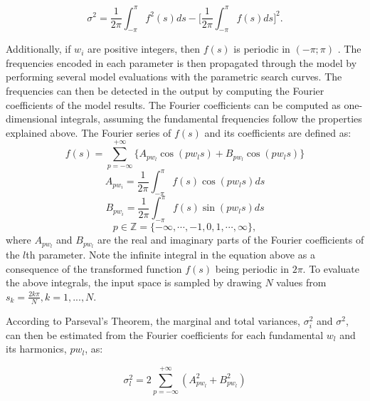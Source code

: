 \documentclass[12pt]{article}
\begin{document}
{\begin{equation}
\sigma^{2} = \frac{1}{2\pi}\int^{\pi}_{-\pi}f^{2}(s)ds - \Bigg[\frac{1}{2\pi}\int^{\pi}_{-\pi}f(s)ds\Bigg]^{2}.
\end{equation}

\vspace{0.5cm}

Additionally, if $w_{i}$ are positive integers, then $f(s)$ is periodic in $(-\pi;\pi)$ \cite{Cukier1973}.
The frequencies encoded in each parameter is then propagated through the model by performing several model evaluations with the parametric search curves. The frequencies can then be detected in the output by computing the Fourier coefficients of the model results. The Fourier coefficients can be computed as one-dimensional integrals, assuming the fundamental frequencies follow the properties explained above. The Fourier series of $f(s)$ and its coefficients are defined as:
\begin{equation}
f(s)=\sum^{+\infty}_{p=-\infty}\{A_{pw_{l}}\cos (pw_{l}s) + B_{pw_{l}}\cos (pw_{l}s)\}
\end{equation}
\begin{equation}
A_{pw_{i}}=\frac{1}{2\pi}\int^{\pi}_{-\pi}f(s)\cos(pw_{l}s)ds%
\end{equation}
\begin{equation}
B_{pw_{i}}=\frac{1}{2\pi}\int^{\pi}_{-\pi}f(s)\sin(pw_{l}s)ds%
\end{equation}
\[p \in \mathbb{Z}=\{-\infty, \cdots,-1,0,1,\cdots,\infty\}, \]
where $A_{pw_{l}}$ and $B_{pw_{l}}$ are the real and imaginary parts of the Fourier coefficients of the $l$th parameter. Note the infinite integral in the equation above as a consequence of the transformed function $f(s)$ being periodic in $2\pi$. To evaluate the above integrals, the input space is sampled by drawing $N$ values from $s_{k}=\frac{2k\pi}{N}, k=1,...,N$.

According to Parseval's Theorem, the marginal and total variances, $\sigma^{2}_{i}$ and $\sigma^{2}$, can then be estimated from the Fourier coefficients for each fundamental $w_{l}$ and its harmonics, $pw_{l}$, as:

\begin{equation} 
\sigma^{2}_{l}=2\sum^{+\infty}_{p=-\infty}(A^{2}_{pw_{l}}+B^{2}_{pw_{l}})
\end{equation}

}
\end{document}
